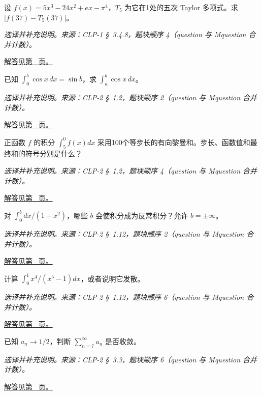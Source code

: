 \documentclass[UTF8,12pt,a4paper,fontset=fandol]{ctexart}
\begin{document}
\begin{example}\label{ex:c45q6}
设 $f(x)=5x^3-24x^2+ex-\pi^4$，$T_5$ 为它在1处的五次 Taylor 多项式。求 $|f(37)-T_5(37)|$。
\par\textit{选译并补充说明。来源：CLP-1 \S~3.4.8，题块顺序 4（question 与 Mquestion 合并计数）。}\par\hyperref[ans:c45q6]{解答见第~\pageref{ans:c45q6} 页。}
\end{example}
\begin{example}[定积分区间的可加性]\label{ex:c45q7}
已知 $\int_0^b\cos x\,dx=\sin b$，求 $\int_a^b\cos x\,dx$。
\par\textit{选译并补充说明。来源：CLP-2 \S~1.2，题块顺序 2（question 与 Mquestion 合并计数）。}\par\hyperref[ans:c45q7]{解答见第~\pageref{ans:c45q7} 页。}
\end{example}
\begin{example}[反向积分中的符号]\label{ex:c45q8}
正函数 $f$ 的积分 $\int_5^0f(x)dx$ 采用100个等步长的有向黎曼和。步长、函数值和最终和的符号分别是什么？
\par\textit{选译并补充说明。来源：CLP-2 \S~1.2，题块顺序 4（question 与 Mquestion 合并计数）。}\par\hyperref[ans:c45q8]{解答见第~\pageref{ans:c45q8} 页。}
\end{example}
\begin{example}[连续被积函数何时产生反常积分]\label{ex:c45q9}
对 $\int_0^b dx/(1+x^2)$，哪些 $b$ 会使积分成为反常积分？允许 $b=\pm\infty$。
\par\textit{选译并补充说明。来源：CLP-2 \S~1.12，题块顺序 2（question 与 Mquestion 合并计数）。}\par\hyperref[ans:c45q9]{解答见第~\pageref{ans:c45q9} 页。}
\end{example}
\begin{example}[不能直接跨过对数奇点]\label{ex:c45q10}
计算 $\int_0^1x^4/(x^5-1)dx$，或者说明它发散。
\par\textit{选译并补充说明。来源：CLP-2 \S~1.12，题块顺序 6（question 与 Mquestion 合并计数）。}\par\hyperref[ans:c45q10]{解答见第~\pageref{ans:c45q10} 页。}
\end{example}
\begin{example}[非零通项极限]\label{ex:c45q11}
已知 $a_n\to1/2$，判断 $\sum_{n=7}^\infty a_n$ 是否收敛。
\par\textit{选译并补充说明。来源：CLP-2 \S~3.3，题块顺序 6（question 与 Mquestion 合并计数）。}\par\hyperref[ans:c45q11]{解答见第~\pageref{ans:c45q11} 页。}
\end{example}
\end{document}
